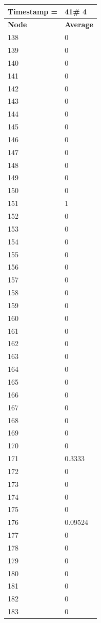 \begin{tabular}{|l||l|}
\hline
\textbf{Timestamp =} & \textbf{41}\# 4\\\hline
	\textbf{Node} & \textbf{Average} \\ \hline
\hline
	138 & 0 \\ \hline
	139 & 0 \\ \hline
	140 & 0 \\ \hline
	141 & 0 \\ \hline
	142 & 0 \\ \hline
	143 & 0 \\ \hline
	144 & 0 \\ \hline
	145 & 0 \\ \hline
	146 & 0 \\ \hline
	147 & 0 \\ \hline
	148 & 0 \\ \hline
	149 & 0 \\ \hline
	150 & 0 \\ \hline
	151 & 1 \\ \hline
	152 & 0 \\ \hline
	153 & 0 \\ \hline
	154 & 0 \\ \hline
	155 & 0 \\ \hline
	156 & 0 \\ \hline
	157 & 0 \\ \hline
	158 & 0 \\ \hline
	159 & 0 \\ \hline
	160 & 0 \\ \hline
	161 & 0 \\ \hline
	162 & 0 \\ \hline
	163 & 0 \\ \hline
	164 & 0 \\ \hline
	165 & 0 \\ \hline
	166 & 0 \\ \hline
	167 & 0 \\ \hline
	168 & 0 \\ \hline
	169 & 0 \\ \hline
	170 & 0 \\ \hline
	171 & 0.3333 \\ \hline
	172 & 0 \\ \hline
	173 & 0 \\ \hline
	174 & 0 \\ \hline
	175 & 0 \\ \hline
	176 & 0.09524 \\ \hline
	177 & 0 \\ \hline
	178 & 0 \\ \hline
	179 & 0 \\ \hline
	180 & 0 \\ \hline
	181 & 0 \\ \hline
	182 & 0 \\ \hline
	183 & 0 \\ \hline
\end{tabular}
